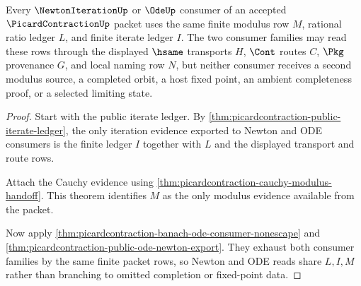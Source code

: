 \begin{theorem}
\label{thm:picardcontraction-newton-ode-shared-modulus-route}
Every $\NewtonIterationUp$ or $\OdeUp$ consumer of an accepted $\PicardContractionUp$ packet uses the same finite modulus row $M$, rational ratio ledger $L$, and finite iterate ledger $I$. The two consumer families may read these rows through the displayed $\hsame$ transports $H$, $\Cont$ routes $C$, $\Pkg$ provenance $G$, and local naming row $N$, but neither consumer receives a second modulus source, a completed orbit, a host fixed point, an ambient completeness proof, or a selected limiting state.
\end{theorem}
\begin{proof}
Start with the public iterate ledger. By \autoref{thm:picardcontraction-public-iterate-ledger}, the only iteration evidence exported to Newton and ODE consumers is the finite ledger $I$ together with $L$ and the displayed transport and route rows.

Attach the Cauchy evidence using \autoref{thm:picardcontraction-cauchy-modulus-handoff}. This theorem identifies $M$ as the only modulus evidence available from the packet.

Now apply \autoref{thm:picardcontraction-banach-ode-consumer-nonescape} and \autoref{thm:picardcontraction-public-ode-newton-export}. They exhaust both consumer families by the same finite packet rows, so Newton and ODE reads share $L,I,M$ rather than branching to omitted completion or fixed-point data.
\end{proof}

